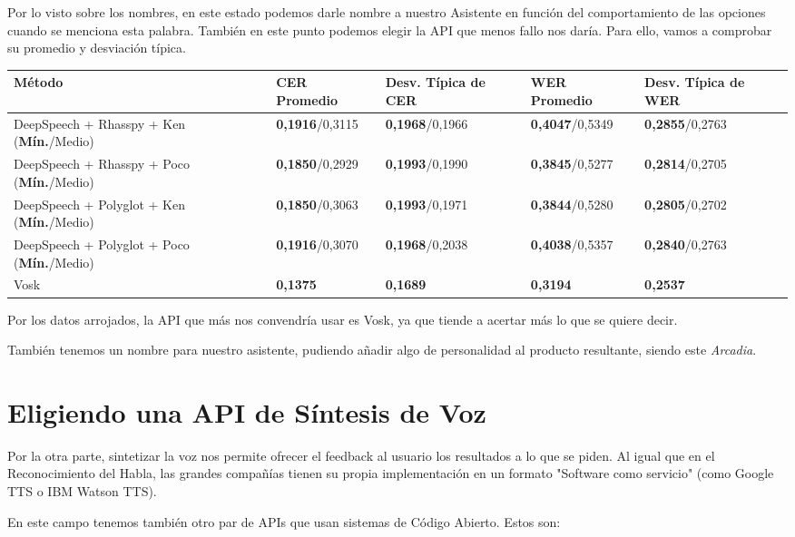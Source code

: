 Por lo visto sobre los nombres, en este estado podemos darle nombre a nuestro Asistente en función del comportamiento de las opciones cuando se menciona esta palabra. También en este punto podemos elegir la API que menos fallo nos daría. Para ello, vamos a comprobar su promedio y desviación típica.

\begin{xltabular}{\textwidth}{|X|X|X|X|X|}
	\hline
	Método & CER Promedio & Desv. Típica de CER & WER Promedio & Desv. Típica de WER \\ \hline
	DeepSpeech + Rhasspy + Ken (\textbf{Mín.}/Medio) & \textbf{0,1916}/0,3115 & \textbf{0,1968}/0,1966 & \textbf{0,4047}/0,5349 & \textbf{0,2855}/0,2763 \\ \hline
	DeepSpeech + Rhasspy + Poco (\textbf{Mín.}/Medio) & \textbf{0,1850}/0,2929 & \textbf{0,1993}/0,1990 & \textbf{0,3845}/0,5277 & \textbf{0,2814}/0,2705 \\ \hline
	DeepSpeech + Polyglot + Ken (\textbf{Mín.}/Medio) & \textbf{0,1850}/0,3063 & \textbf{0,1993}/0,1971 & \textbf{0,3844}/0,5280 & \textbf{0,2805}/0,2702 \\ \hline
	DeepSpeech + Polyglot + Poco (\textbf{Mín.}/Medio) & \textbf{0,1916}/0,3070 & \textbf{0,1968}/0,2038 & \textbf{0,4038}/0,5357 & \textbf{0,2840}/0,2763 \\ \hline
	Vosk & \textbf{0,1375} & \textbf{0,1689} & \textbf{0,3194} & \textbf{0,2537} \\ \hline
\end{xltabular} 

Por los datos arrojados, la API que más nos convendría usar es Vosk, ya que tiende a acertar más lo que se quiere decir. 

También tenemos un nombre para nuestro asistente, pudiendo añadir algo de personalidad al producto resultante, siendo este \textit{Arcadia}.

\section{Eligiendo una API de Síntesis de Voz}
Por la otra parte, sintetizar la voz nos permite ofrecer el feedback al usuario los resultados a lo que se piden. Al igual que en el Reconocimiento del Habla, las grandes compañías tienen su propia implementación en un formato "Software como servicio" (como Google TTS o IBM Watson TTS).

En este campo tenemos también otro par de APIs que usan sistemas de Código Abierto. Estos son:

